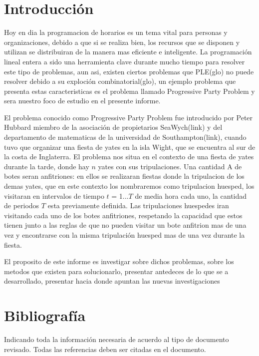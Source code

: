 \documentclass[spanish, fleqn]{article}
\begin{document}
\section{Introducción}

Hoy en dia la programacion de horarios es un tema vital para personas y organizaciones, debido a que si se realiza bien, los recursos que se disponen y utilizan se distribuiran de la  manera mas eficiente e inteligente. La programación lineal entera a sido una herramienta clave durante mucho tiempo para resolver este tipo de problemas, aun asi, existen ciertos problemas que PLE(glo) no puede resolver debido a su exploción combinatorial(glo), un ejemplo problema que presenta estas caracteristicas es el problema llamado Progressive Party Problem y sera nuestro foco de estudio en el presente informe.

El problema conocido como Progressive Party Problem fue introducido por Peter Hubbard miembro de la asociación de propietarios SeaWych(link) y del departamento de matematicas de la universidad de Southampton(link), cuando tuvo que organizar una fiesta de yates en la isla Wight, que se encuentra al sur de la costa de Inglaterra. El problema nos situa en el contexto de una fiesta de yates durante la tarde, donde hay $\mathit{n}$ yates con sus tripulaciones. Una cantidad $\mathrm{A}$ de botes seran anfitriones: en ellos se realizaran fiestas donde la tripulacion de los demas yates, que en este contexto los nombraremos como tripulacion huesped, los visitaran en intervalos de tiempo $\mathit{t}$ = 1...$\mathit{T}$ de media hora cada uno, la cantidad de periodos $\mathit{T}$ esta previamente definida. Las tripulaciones huespedes iran visitando cada uno de los botes anfitriones, respetando la capacidad que estos tienen junto a las reglas de que no pueden visitar un bote anfitrion mas de una vez y encontrarse con la misma tripulación huesped mas de una vez durante la fiesta.

El proposito de este informe es investigar sobre dichos problemas, sobre los metodos que existen para solucionarlo, presentar antedeces de lo que se a desarrollado, presentar hacia donde apuntan las nuevas investigaciones
 
\section{Bibliografía}
Indicando toda la informaci\'on necesaria de acuerdo al tipo de documento revisado. Todas las referencias deben ser citadas en el documento.


\end{document}
